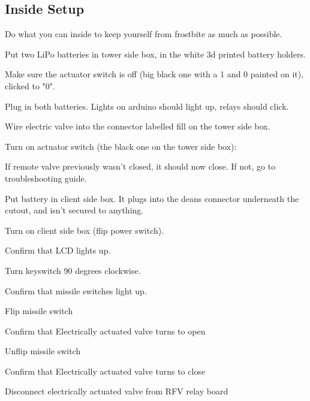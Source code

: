 \subsection{Inside Setup}
Do what you can inside to keep yourself from frostbite as much as possible.
\begin{checklist}
    \item Put two LiPo batteries in tower side box, in the white 3d printed 
battery holders.
    \item Make sure the actuator switch is off (big black one with a 1 and 0
painted on it), clicked to "0".
    \item Plug in both batteries. Lights on arduino should light up, relays
should click.
    \item Wire electric valve into the connector labelled fill on the tower
side box.
    \item Turn on actuator switch (the black one on the tower side box):
    \begin{checklist}
        \item If remote valve previously wasn't closed, it should now close. If 
not, go to troubleshooting guide.
    \end{checklist}
    \item Put battery in client side box. It plugs into the deans connector
underneath the cutout, and isn't secured to anything.
    \item Turn on client side box (flip power switch).
    \begin{checklist}
        \item Confirm that LCD lights up.
    \end{checklist}
    \item Turn keyswitch 90 degrees clockwise.
    \begin{checklist}
        \item Confirm that missile switches light up.
    \end{checklist}
    \item Flip \rfill{} missile switch
    \begin{checklist}
        \item Confirm that Electrically actuated valve turns to open
    \end{checklist}
    \item Unflip \rfill{} missile switch
    \begin{checklist}
        \item Confirm that Electrically actuated valve turns to close
    \end{checklist}
    \item Disconnect electrically actuated valve from RFV relay board
\end{checklist}

